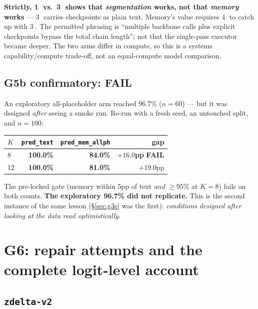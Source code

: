 \documentclass[11pt, a4paper]{article}
\newcommand{\FAIL}{\textcolor{red!70!black}{\textbf{FAIL}}}
\begin{document}
\textbf{Strictly, \textcircled{1} vs.\ \textcircled{3} shows that \emph{segmentation}
works, not that \emph{memory} works} --- \textcircled{3} carries checkpoints as plain
text. Memory's value requires \textcircled{4} to catch up with \textcircled{3}. The
permitted phrasing is ``multiple backbone calls plus explicit checkpoints bypass the total
chain length''; not that the single-pass executor became deeper. The two arms differ in
compute, so this is a systems capability/compute trade-off, not an equal-compute model
comparison.

\subsection{G5b confirmatory: \FAIL{}}

An exploratory all-placeholder arm reached 96.7\% ($n{=}60$) --- but it was designed
\emph{after} seeing a smoke run. Re-run with a fresh seed, an untouched split, and
$n{=}100$:

\begin{table}[h]
\centering\small
\begin{tabular}{lrrr}
\toprule
$K$ & \verb|pred_text| & \verb|pred_mem_allph| & gap \\
\midrule
8 & \textbf{100.0\%} & \textbf{84.0\%} & \textbf{$+16.0$pp} \FAIL{} \\
12 & \textbf{100.0\%} & \textbf{81.0\%} & $+19.0$pp \\
\bottomrule
\end{tabular}
\end{table}

The pre-locked gate (memory within 5pp of text \emph{and} $\ge 95\%$ at $K{=}8$) fails on
both counts. \textbf{The exploratory 96.7\% did not replicate.} This is the second
instance of the same lesson (\S\ref{sec:g3e} was the first): \emph{conditions designed
after looking at the data read optimistically}.

\section{G6: repair attempts and the complete logit-level account}\label{sec:g6}

\subsection{\texttt{zdelta-v2}}
\end{document}
